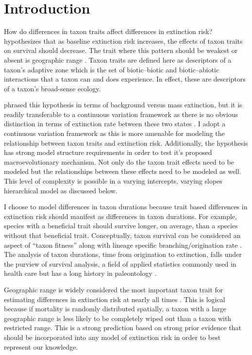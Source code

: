 \documentclass[12pt,letterpaper]{article}
\begin{document}
\section{Introduction}

How do differences in taxon traits affect differences in extinction risk? \citet{Jablonski1986} hypothesizes that as baseline extinction risk increases, the effects of taxon traits on survival should decrease. The trait where this pattern should be weakest or absent is geographic range \citep{Jablonski1986}. Taxon traits are defined here as descriptors of a taxon's adaptive zone which is the set of biotic--biotic and biotic--abiotic interactions that a taxon can and does experience. In effect, these are descriptors of a taxon's broad-sense ecology.

\citet{Jablonski1986} phrased this hypothesis in terms of background versus mass extinction, but it is readily transferable to a continuous variation framework as there is no obvious distinction in terms of extinction rate between these two states \citep{Wang2003}. I adopt a continuous variation framework as this is more amenable for modeling the relationship between taxon traits and extinction risk. Additionally, the \citet{Jablonski1986} hypothesis has strong model structure requirements in order to test it's proposed macroevolutionary mechanism. Not only do the taxon trait effects need to be modeled but the relationships between these effects need to be modeled as well. This level of complexity is possible in a varying intercepts, varying slopes hierarchical model as discussed below.

I choose to model differences in taxon durations because trait based differences in extinction risk should manifest as differences in taxon durations. For example, species with a beneficial trait should survive longer, on average, than a species without that beneficial trait. Conceptually, taxon survival can be considered an aspect of ``taxon fitness'' along with lineage specific branching/origination rate \citep{Cooper1984,Palmer2012}. The analysis of taxon durations, time from origination to extinction, falls under the purview of survival analysis, a field of applied statistics commonly used in health care \citep{Klein2003} but has a long history in paleontology \citep{Simpson1944,Simpson1953,VanValen1973,VanValen1979}.

Geographic range is widely considered the most important taxon trait for estimating differences in extinction risk at nearly all times \citep{Jablonski1986,Jablonski1987,Jablonski2003,Payne2007}. This is logical because if mortality is randomly distributed spatially, a taxon with a large geographic range is less likely to be completely wiped out than a taxon with restricted range. This is a strong prediction based on strong prior evidence that should be incorporated into any model of extinction risk in order to best represent our knowledge.
\end{document}
